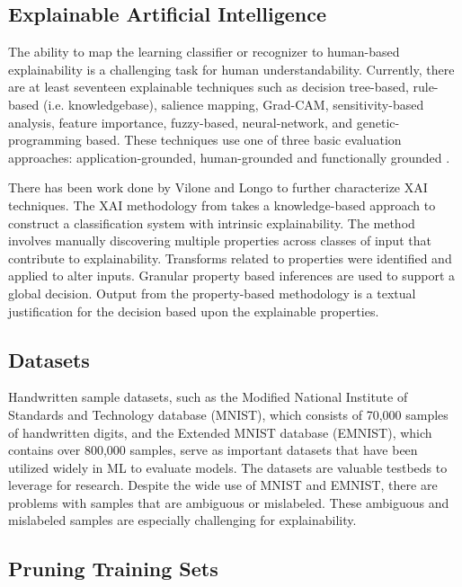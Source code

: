 \documentclass[conference]{IEEEtran}
\begin{document}
\subsection{Explainable Artificial Intelligence}

The ability to map the learning classifier or recognizer to human-based
explainability is a challenging task for human understandability.  Currently,
there are at least seventeen explainable techniques such as decision tree-based,
rule-based (i.e. knowledgebase), salience mapping, Grad-CAM, sensitivity-based analysis,
feature importance, fuzzy-based, neural-network, and genetic-programming based.
These techniques use one of three basic evaluation approaches:
application-grounded, human-grounded and functionally grounded
\cite{Arrieta2020ExplainableAI,Survey18,Fuzzy19,Hagras18,GP18,selvaraju2017grad}.

There has been work done by Vilone and Longo \cite{vilone2020explainable} to
further characterize XAI techniques.  The XAI methodology from \cite{whitten21}
takes a knowledge-based approach to construct a classification system with
intrinsic explainability.  The method involves manually discovering multiple
properties across classes of input that contribute to explainability.
Transforms related to properties were identified and applied to alter inputs.
Granular property based inferences are used to support a global decision.
Output from the property-based methodology is a textual justification for the
decision based upon the explainable properties.

\subsection{Datasets}

Handwritten sample datasets, such as the Modified National Institute of
Standards and Technology database (MNIST)\cite{deng2012mnist}, which consists of
70,000 samples of handwritten digits, and the Extended MNIST database\cite{cohen2017emnist}
(EMNIST), which contains over 800,000 samples, serve as
important datasets that have been utilized widely in ML to evaluate models. The
datasets are valuable testbeds to leverage for research. Despite the wide use of
MNIST and EMNIST, there are problems with samples that are ambiguous or
mislabeled.  These ambiguous and mislabeled samples are especially challenging
for explainability.

\subsection{Pruning Training Sets}
\end{document}
